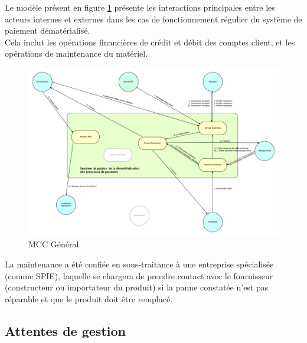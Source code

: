 Le modèle présent en figure \ref{fig:mcc-extra} présente les interactions
principales entre les acteurs internes et externes dans les cas de
fonctionnement régulier du système de paiement dématérialisé. \\

Cela inclut les opérations financières de crédit et débit des comptes client,
et les opérations de maintenance du matériel.

\begin{landscape}
  \begin{figure}[ht]
      \centering
      \includegraphics[width=0.7\paperheight]{mcc-extra}
      \caption{MCC Général}
      \label{fig:mcc-extra}
  \end{figure}
\end{landscape}

La maintenance a été confiée en sous-traitance à une entreprise spécialisée
(comme SPIE), laquelle se chargera de prendre contact avec le fournisseur
(constructeur ou importateur du produit) si la panne constatée n'est pas
réparable et que le produit doit être remplacé.

\subsection{Attentes de gestion}

